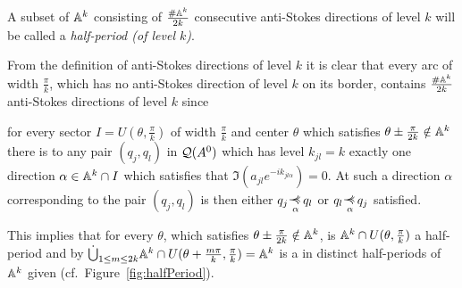 \begin{defn}
  A subset of $\mathbb{A}^k$ consisting of $\frac{\#\mathbb{A}^k}{2k}$ consecutive anti-Stokes
  directions of level $k$ will be called a \emph{half-period (of level $k$)}.
\end{defn}
From the definition of anti-Stokes directions of level $k$ it is clear that
every arc of width $\frac{\pi}{k}$, which has no anti-Stokes direction of level
$k$ on its border, contains $\frac{\#\mathbb{A}^k}{2k}$ anti-Stokes directions of level
$k$ since
\begin{einr}
  for every sector $I=U(\theta,\frac{\pi}{k})$ of width $\frac{\pi}{k}$ and
  center $\theta$ which satisfies $\theta\pm\frac{\pi}{2k}\notin\mathbb{A}^k$
  there is to any pair $(q_j,q_l)$ in $\mathcal{Q}(A^0)$ which has level $k_{jl}=k$
  exactly one direction $\alpha\in \mathbb{A}^k\cap I$ which satisfies that
  $\Im(a_{jl}e^{-ik_{jl\alpha}})=0$.
  At such a direction $\alpha$ corresponding to the pair $(q_j,q_l)$ is then
  either $q_j\myrel{\alpha}q_l$ or $q_l\myrel{\alpha}q_j$ satisfied.
\end{einr}
This implies that for every $\theta$, which satisfies
$\theta\pm\frac{\pi}{2k}\notin\mathbb{A}^k$, is $\mathbb{A}^k\cap U(\theta,\frac{\pi}{k})$
a half-period and by
$\dot\bigcup_{1\leq m\leq 2k}\mathbb{A}^k\cap U(\theta+\frac{m\pi}{k},\frac{\pi}{k})
=\mathbb{A}^k$ is a  in
distinct half-periods of $\mathbb{A}^k$ given (cf.\ Figure~\ref{fig:halfPeriod}).

